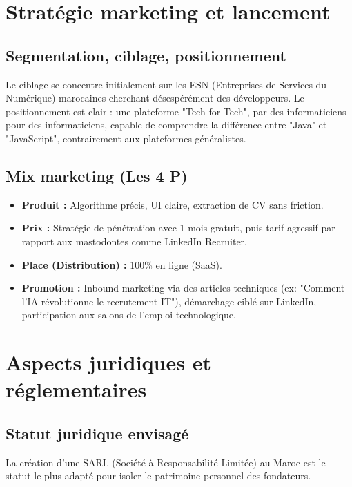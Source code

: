 \documentclass[12pt,a4paper]{report}
\begin{document}
\begin{itemize}
\section{Stratégie marketing et lancement}

\subsection{Segmentation, ciblage, positionnement}
Le ciblage se concentre initialement sur les ESN (Entreprises de Services du Numérique) marocaines cherchant désespérément des développeurs. Le positionnement est clair : une plateforme "Tech for Tech", par des informaticiens pour des informaticiens, capable de comprendre la différence entre "Java" et "JavaScript", contrairement aux plateformes généralistes.

\subsection{Mix marketing (Les 4 P)}
\begin{itemize}
    \item \textbf{Produit :} Algorithme précis, UI claire, extraction de CV sans friction.
    \item \textbf{Prix :} Stratégie de pénétration avec 1 mois gratuit, puis tarif agressif par rapport aux mastodontes comme LinkedIn Recruiter.
    \item \textbf{Place (Distribution) :} 100\% en ligne (SaaS).
    \item \textbf{Promotion :} Inbound marketing via des articles techniques (ex: "Comment l'IA révolutionne le recrutement IT"), démarchage ciblé sur LinkedIn, participation aux salons de l'emploi technologique.
\end{itemize}

\section{Aspects juridiques et réglementaires}

\subsection{Statut juridique envisagé}
La création d'une SARL (Société à Responsabilité Limitée) au Maroc est le statut le plus adapté pour isoler le patrimoine personnel des fondateurs.


\end{itemize}
\end{document}
